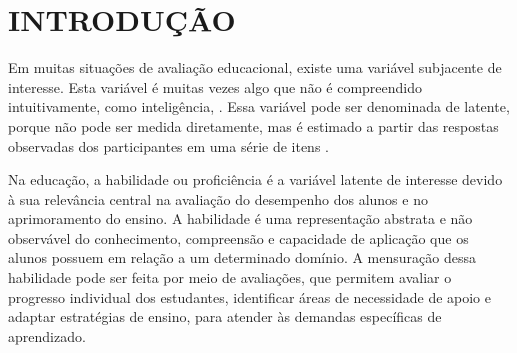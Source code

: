 \chapter{INTRODUÇÃO}

Em muitas situações de avaliação educacional, existe uma variável subjacente de interesse. Esta variável é muitas vezes algo que não é compreendido intuitivamente, como inteligência, \cite{baker2001}. Essa variável pode ser denominada de latente, porque não pode ser medida diretamente, mas é estimado a partir das respostas observadas dos participantes em uma série de itens \cite{pasquali2003}. 


Na educação, a habilidade ou proficiência é a variável latente de interesse devido à sua relevância central na avaliação do desempenho dos alunos e no aprimoramento do ensino. A habilidade é uma representação abstrata e não observável do conhecimento, compreensão e capacidade de aplicação que os alunos possuem em relação a um determinado domínio. A mensuração dessa habilidade pode ser feita por meio de avaliações, que permitem avaliar o progresso individual dos estudantes, identificar áreas de necessidade de apoio e adaptar estratégias de ensino, para atender às demandas específicas de aprendizado.
\begin{comment}
	A avaliação desempenha um papel de extrema importância no contexto educacional, conforme enfatizado por Gimeno (1994) ao afirmar que ``a função fundamental que a avaliação deve cumprir no processo didático é a de informar ou conscientizar os professores acerca de como caminham os acontecimentos em sua turma, os processos de aprendizagem que desencadeiam em cada um de seus alunos, durante o mesmo.'' Essa citação destaca que a avaliação vai além de simplesmente medir resultados; ela serve como um meio essencial para os educadores compreenderem o desenvolvimento de suas turmas. Através da avaliação, os professores podem identificar as necessidades específicas de cada estudante, adaptar suas abordagens pedagógicas e fornecer suporte personalizado, criando um ambiente educacional que promove o crescimento tanto individual quanto coletivo.



A estimativa da habilidade em simulados do oferece aos estudantes uma compreensão precisa do seu nível de preparação e das áreas que requerem melhoria. Isso permite que os alunos identifiquem seus pontos fortes e fracos, direcionando seus esforços de estudo de forma mais eficaz. Além disso, a estimativa da habilidade ajuda os educadores e instituições a adaptar estratégias de ensino e programas de apoio com base nas necessidades reais dos estudantes, contribuindo para um ensino mais eficaz. Para a gestão educacional, a habilidade estimada em simulados pode fornecer informações valiosas sobre o desempenho dos alunos em nível nacional e regional, orientando políticas educacionais informadas e promovendo a melhoria contínua do sistema educacional. 

\end{comment}


